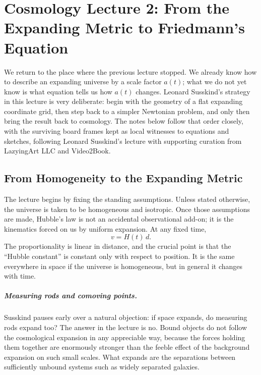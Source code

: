 \chapter{Cosmology Lecture 2: From the Expanding Metric to Friedmann's Equation}

We return to the place where the previous lecture stopped. We already know how to describe an expanding universe by a scale factor \(a(t)\); what we do not yet know is what equation tells us how \(a(t)\) changes. Leonard Susskind's strategy in this lecture is very deliberate: begin with the geometry of a flat expanding coordinate grid, then step back to a simpler Newtonian problem, and only then bring the result back to cosmology. The notes below follow that order closely, with the surviving board frames kept as local witnesses to equations and sketches, following Leonard Susskind's lecture with supporting curation from LazyingArt LLC and Video2Book.

\section{From Homogeneity to the Expanding Metric}

The lecture begins by fixing the standing assumptions. Unless stated otherwise, the universe is taken to be homogeneous and isotropic. Once those assumptions are made, Hubble's law is not an accidental observational add-on; it is the kinematics forced on us by uniform expansion. At any fixed time,
\begin{equation}
v = H(t)\,d.
\end{equation}
The proportionality is linear in distance, and the crucial point is that the ``Hubble constant'' is constant only with respect to position. It is the same everywhere in space if the universe is homogeneous, but in general it changes with time.

\paragraph{Measuring rods and comoving points.}
Susskind pauses early over a natural objection: if space expands, do measuring rods expand too? The answer in the lecture is no. Bound objects do not follow the cosmological expansion in any appreciable way, because the forces holding them together are enormously stronger than the feeble effect of the background expansion on such small scales. What expands are the separations between sufficiently unbound systems such as widely separated galaxies.

